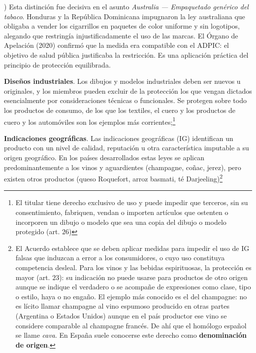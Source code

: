 \documentclass[10pt,a4paper]{article}
\newcounter{alphaitem}
\newenvironment{la}
      {\begin{list}{\alph{alphaitem})}{%
          \usecounter{alphaitem}%
          \setlength{\leftmargin}{1cm}%
          \setlength{\parskip}{3pt}%
          \setlength{\itemsep}{0pt}%
          \setlength{\parsep}{0pt}%
      }}
      {\end{list}}
\begin{document}
\begin{la}
{        Esta distinción fue decisiva en el asunto \textit{Australia --- Empaquetado genérico del tabaco}. Honduras y la República Dominicana impugnaron la ley australiana que obligaba a vender los cigarrillos en paquetes de color uniforme y sin logotipos, alegando que restringía injustificadamente el uso de las marcas. El Órgano de Apelación (2020) confirmó que la medida era compatible con el ADPIC: el objetivo de salud pública justificaba la restricción. Es una aplicación práctica del principio de protección equilibrada.
    }
    \item \textbf{Diseños industriales}. Los dibujos y modelos industriales deben ser nuevos u originales, y los miembros pueden excluir de la protección los que vengan dictados esencialmente por consideraciones técnicas o funcionales. Se protegen sobre todo los productos de consumo, de los que los textiles, el cuero y los productos de cuero y los automóviles son los ejemplos más corrientes;\footnote{%
      El titular tiene derecho exclusivo de uso y puede impedir que terceros, sin su consentimiento, fabriquen, vendan o importen artículos que ostenten o incorporen un dibujo o modelo que sea una copia del dibujo o modelo protegido (art. $26$)
    }
    \item \textbf{Indicaciones geográficas}. Las indicaciones geográficas (IG) identifican un producto con un nivel de calidad, reputación u otra característica imputable a su origen geográfico. En los países desarrollados estas leyes se aplican predominantemente a los vinos y aguardientes (champagne, coñac, jerez), pero existen otros productos (queso Roquefort, arroz basmati, té Darjeeling)\footnote{%
         El Acuerdo establece que se deben aplicar medidas para impedir el uso de IG falsas que induzcan a error a los consumidores, o cuyo uso constituya competencia desleal. Para los vinos y las bebidas espirituosas, la protección es mayor (art. $23$): su indicación no puede usarse para productos de otro origen aunque se indique el verdadero o se acompañe de expresiones como clase, tipo o estilo, haya o no engaño. El ejemplo más conocido es el del champagne: no es lícito llamar champagne al vino espumoso producido en otras partes (Argentina o Estados Unidos) aunque en el país productor ese vino se considere comparable al champagne francés. De ahí que el homólogo español se llame \textit{cava}. En España suele conocerse este derecho como \textbf{denominación de origen}. 
        
}
\end{la}
\end{document}
